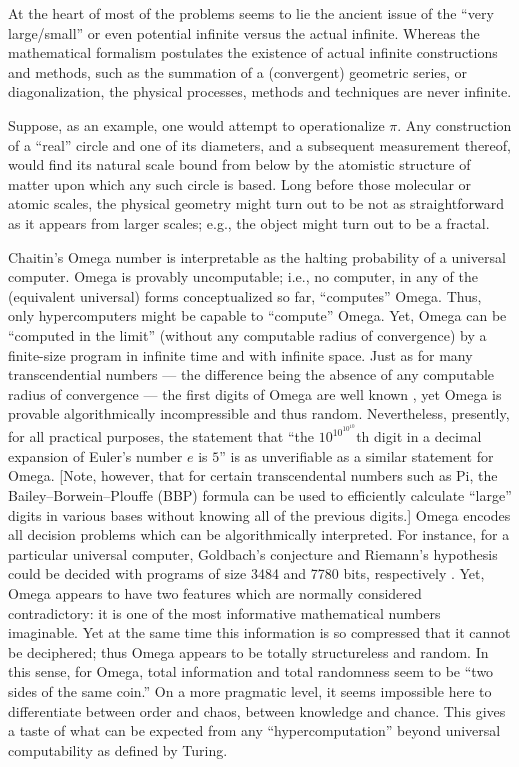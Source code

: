 \documentclass[12pt]{article}
\begin{document}
At the heart of most of the problems seems to lie the ancient issue of the ``very large/small'' or even potential
infinite versus the actual infinite.
Whereas the mathematical formalism postulates the existence of  actual
infinite constructions and methods,
such as the summation of a (convergent) geometric series, or diagonalization,
the physical processes, methods and techniques are never infinite.

Suppose, as an example, one would attempt to operationalize $\pi$.
Any construction of a ``real'' circle and one of its diameters, and a
subsequent measurement thereof,
would find its natural scale bound from below by the atomistic structure of
matter upon which any such  circle
is based.
Long before those molecular or atomic scales,
the physical geometry might turn out to be not as straightforward as it
appears from
larger scales; e.g., the object might turn out to be a fractal.

Chaitin's Omega number \cite{chaitin3} is
interpretable as the halting probability of a universal computer.
Omega is provably uncomputable; i.e., no computer, in any of the (equivalent universal) forms conceptualized so far,
``computes'' Omega. Thus, only hypercomputers might be capable to ``compute'' Omega.
Yet, Omega can be ``computed in the limit'' (without any computable radius of convergence)
by a finite-size program in infinite time and with infinite space.
Just as for many transcendential numbers --- the difference being the absence of any computable radius of convergence ---
the first digits of Omega are well known
\cite{calude-dinneen06}, yet
Omega is provable algorithmically incompressible and thus random.
Nevertheless, presently, for all practical purposes, the statement that
``the $10^{10^{10^{10}}}$th digit in a decimal expansion of Euler's number $e$ is $5$''
is as unverifiable as a similar statement for Omega.
[Note, however, that for certain transcendental numbers  such as Pi,
the Bailey--Borwein--Plouffe (BBP) formula \cite{bailey97,bailey05}
can be used to efficiently calculate ``large'' digits
in various bases without knowing all of the previous digits.]
Omega encodes all decision problems which can be algorithmically interpreted.
For instance, for a particular universal computer,
Goldbach's conjecture and Riemann's hypothesis could be decided with programs of size 3484 and 7780 bits,
respectively \cite{calude-elena-dinneen06}.
Yet, Omega  appears to have two features which are normally considered contradictory:
it is one of the most informative mathematical numbers imaginable.
Yet at the same time this information is so compressed that it cannot be deciphered;
thus Omega appears to be totally structureless and random.
In this sense, for Omega, total information and total randomness seem to be ``two sides of the same coin.''
On a more pragmatic level, it seems impossible here to differentiate between order and chaos,
between knowledge and chance.
This gives a taste of what can be expected from any ``hypercomputation''
beyond universal computability as defined by Turing.
\end{document}
